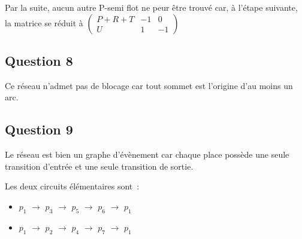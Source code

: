 Par la suite, aucun autre P-semi flot ne peur être trouvé car, à
l'étape suivante, la matrice se réduit à
$ \begin{pmatrix}
P+R+T&-1&0 \\
U&1&-1
\end{pmatrix}$
\subsection*{Question 8}
Ce réseau n'admet pas de blocage car tout sommet est l'origine d'au
moins un arc.
\subsection*{Question 9}
Le réseau est bien un graphe d'évènement car chaque place possède une
seule transition d'entrée et une seule transition de sortie.

Les deux circuits élémentaires sont~:
\begin{itemize}
\item $p_1$ $\rightarrow$ $p_3$ $\rightarrow$ $p_5$ $\rightarrow$ $p_6$ $\rightarrow$ $p_1$
\item $p_1$ $\rightarrow$ $p_2$ $\rightarrow$ $p_4$ $\rightarrow$ $p_7$ $\rightarrow$ $p_1$
\end{itemize}
